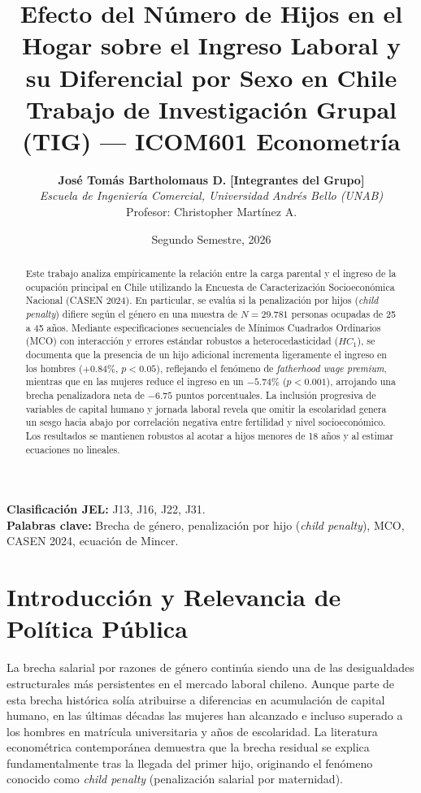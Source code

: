 \documentclass[11pt,a4paper]{article}
\title{\vspace{-1cm}\textbf{Efecto del Número de Hijos en el Hogar sobre el Ingreso Laboral y su Diferencial por Sexo en Chile}\\
\large Trabajo de Investigación Grupal (TIG) --- ICOM601 Econometría}
\author{
  \textbf{José Tomás Bartholomaus D.} \quad \textbf{[Integrantes del Grupo]}\\[0.4em]
  \textit{Escuela de Ingeniería Comercial, Universidad Andrés Bello (UNAB)}\\
  \small Profesor: Christopher Martínez A.
}
\date{Segundo Semestre, 2026}
\begin{document}
\maketitle

\begin{abstract}
Este trabajo analiza empíricamente la relación entre la carga parental y el ingreso de la ocupación principal en Chile utilizando la Encuesta de Caracterización Socioeconómica Nacional (CASEN 2024). En particular, se evalúa si la penalización por hijos (\textit{child penalty}) difiere según el género en una muestra de $N = 29.781$ personas ocupadas de 25 a 45 años. Mediante especificaciones secuenciales de Mínimos Cuadrados Ordinarios (MCO) con interacción y errores estándar robustos a heterocedasticidad ($HC_1$), se documenta que la presencia de un hijo adicional incrementa ligeramente el ingreso en los hombres ($+0.84\%$, $p < 0.05$), reflejando el fenómeno de \textit{fatherhood wage premium}, mientras que en las mujeres reduce el ingreso en un $-5.74\%$ ($p < 0.001$), arrojando una brecha penalizadora neta de $-6.75$ puntos porcentuales. La inclusión progresiva de variables de capital humano y jornada laboral revela que omitir la escolaridad genera un sesgo hacia abajo por correlación negativa entre fertilidad y nivel socioeconómico. Los resultados se mantienen robustos al acotar a hijos menores de 18 años y al estimar ecuaciones no lineales.
\end{abstract}

\vspace{0.3cm}
\noindent \textbf{Clasificación JEL:} J13, J16, J22, J31. \\
\textbf{Palabras clave:} Brecha de género, penalización por hijo (\textit{child penalty}), MCO, CASEN 2024, ecuación de Mincer.

\vspace{0.5cm}

\section{Introducción y Relevancia de Política Pública}
La brecha salarial por razones de género continúa siendo una de las desigualdades estructurales más persistentes en el mercado laboral chileno. Aunque parte de esta brecha histórica solía atribuirse a diferencias en acumulación de capital humano, en las últimas décadas las mujeres han alcanzado e incluso superado a los hombres en matrícula universitaria y años de escolaridad. La literatura econométrica contemporánea \cite{kleven2019, kleven2025} demuestra que la brecha residual se explica fundamentalmente tras la llegada del primer hijo, originando el fenómeno conocido como \textit{child penalty} (penalización salarial por maternidad).
\end{document}
